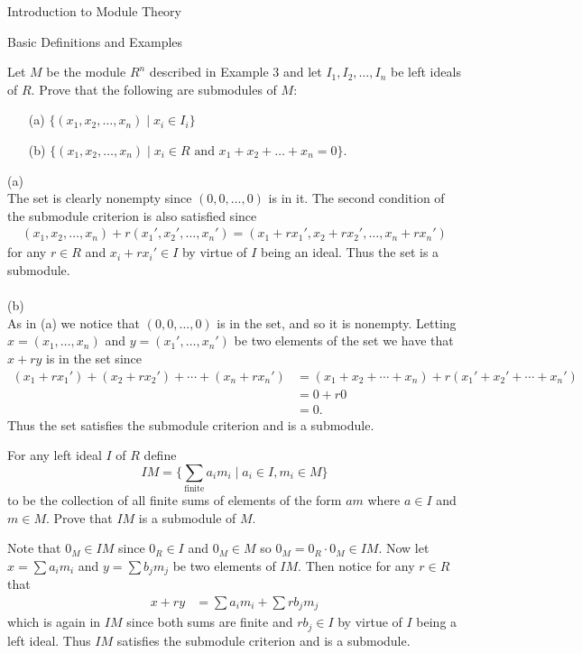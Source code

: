 \begin{chapter}{Introduction to Module Theory}
\begin{section}{Basic Definitions and Examples}
\begin{problem}\label{ex:10.1.4}
Let $M$ be the module $R^n$ described in Example 3 and let $I_1, I_2,\ldots, I_n$ be left ideals of $R$. Prove that the following are submodules of $M$:\begin{enumerate}\item[(a)] $\{(x_1,x_2,\ldots,x_n)\mid x_i\in I_i\}$\item[(b)] $\{(x_1,x_2,\ldots,x_n)\mid x_i\in R \text{ and } x_1+x_2+\ldots +x_n = 0\}$.\end{enumerate}
\end{problem}
\begin{solution}
(a)\\
The set  is clearly nonempty since $(0,0,\ldots,0)$ is in it. The second condition of the submodule criterion is also satisfied since \begin{align*}
(x_1,x_2,\ldots,x_n) + r(x_1',x_2',\ldots,x_n') = (x_1+rx_1',x_2+rx_2',\ldots, x_n+rx_n')
\end{align*}
for any $r\in R$ and $x_i+rx_i'\in I$ by virtue of $I$ being an ideal. Thus the set is a submodule.\\\\
(b)\\
As in (a) we notice that $(0,0,\ldots,0)$ is in the set, and so it is nonempty. Letting $x = (x_1,\ldots,x_n)$ and $y= (x_1',\ldots,x_n')$ be two elements of the set we have that $x+ry$ is in the set since \begin{align*}
(x_1+rx_1')+(x_2+rx_2') + \cdots + (x_n+rx_n') &= (x_1+x_2+\cdots+x_n)+r(x_1'+x_2'+\cdots+x_n')\\
& = 0+r0\\
&=0.
\end{align*}
Thus the set satisfies the submodule criterion and is a submodule.

\end{solution}\oneperpage



\begin{problem}\label{ex:10.1.5}
For any left ideal $I$ of $R$ define \[
IM = \{\sum_{\text{finite}}a_im_i\mid a_i\in I, m_i\in M\}
\]
to be the collection of all finite sums of elements of the form $am$ where $a\in I$ and $m\in M$. Prove that $IM$ is a submodule of $M$. 
\end{problem}
\begin{solution}
Note that $0_M \in IM$ since $0_R\in I$ and $0_M\in M$ so $0_M = 0_R\cdot 0_M \in IM$. Now let $x = \sum a_im_i$ and $y= \sum b_jm_j$ be two elements of $IM$. Then notice for any $r\in R$ that \begin{align*}
x+ry &= \sum a_im_i + \sum rb_jm_j
\end{align*}
which is again in $IM$ since both sums are finite and $r b_j\in I$ by virtue of $I$ being a left ideal. Thus $IM$ satisfies the submodule criterion and is a submodule.
\end{solution}\oneperpage




\end{section}
\end{chapter}
